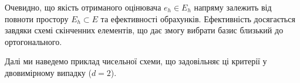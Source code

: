 Очевидно, що якість отриманого оцінювача $e_h \in E_h$ напряму залежить від повноти простору $E_h \subset E$ та ефективності обрахунків.
Ефективність досягається завдяки схемі скінченних елементів, що дає змогу вибрати базис близький до ортогонального.

Далі ми наведемо приклад чисельної схеми, що задовільняє ці критерії у двовимірному випадку ($d=2$).
